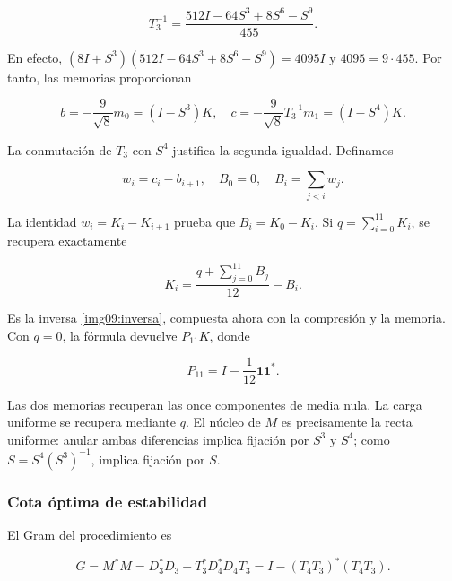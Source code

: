 \begin{equation}
T_3^{-1}=\frac{512I-64S^3+8S^6-S^9}{455}.
\label{nuc11:eq:3}
\end{equation}



En efecto,
\((8I+S^3)(512I-64S^3+8S^6-S^9)=4095I\)
y \(4095=9\cdot455\).
Por tanto, las memorias proporcionan



\begin{equation}
b=-\frac9{\sqrt8}m_0=(I-S^3)K,
\quad c=-\frac9{\sqrt8}T_3^{-1}m_1=(I-S^4)K.
\label{nuc11:eq:4}
\end{equation}



La conmutación de \(T_3\) con \(S^4\) justifica la segunda igualdad.
Definamos



\[
w_i=c_i-b_{i+1},\quad B_0=0,\quad
B_i=\sum_{j<i}w_j.
\]



La identidad \(w_i=K_i-K_{i+1}\) prueba que \(B_i=K_0-K_i\).
Si \(q=\sum_{i=0}^{11}K_i\), se recupera exactamente



\begin{equation}
K_i=\frac{q+\sum_{j=0}^{11}B_j}{12}-B_i.
\label{nuc11:eq:5}
\end{equation}



Es la inversa \eqref{img09:inversa}, compuesta ahora con la
compresión y la memoria. Con \(q=0\), la fórmula devuelve
\(P_{11}K\), donde



\[
P_{11}=I-\frac1{12}\mathbf1\mathbf1^*.
\]



Las dos memorias recuperan las once componentes de media nula.
La carga uniforme se recupera mediante \(q\).
El núcleo de \(M\) es precisamente la recta uniforme:
anular ambas diferencias implica fijación por \(S^3\) y \(S^4\);
como \(S=S^4(S^3)^{-1}\), implica fijación por \(S\).

\subsubsection{Cota óptima de estabilidad}

El Gram del procedimiento es



\begin{equation}
G=M^*M=D_3^*D_3+T_3^*D_4^*D_4T_3
=I-(T_4T_3)^*(T_4T_3).
\label{nuc11:eq:6}
\end{equation}



